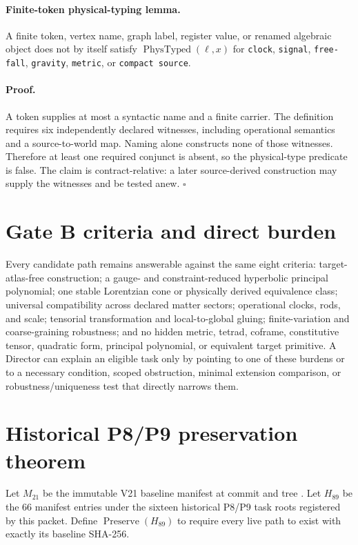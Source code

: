 \documentclass[11pt]{article}
\newcommand{\Typed}{\operatorname{PhysTyped}}
\newcommand{\Preserve}{\operatorname{Preserve}}
\begin{document}
\paragraph{Finite-token physical-typing lemma.}
A finite token, vertex name, graph label, register value, or renamed algebraic
object does not by itself satisfy $\Typed(\ell,x)$ for \texttt{clock},
\texttt{signal}, \texttt{free-fall}, \texttt{gravity}, \texttt{metric}, or
\texttt{compact source}.

\paragraph{Proof.}
A token supplies at most a syntactic name and a finite carrier. The definition
requires six independently declared witnesses, including operational semantics
and a source-to-world map. Naming alone constructs none of those witnesses.
Therefore at least one required conjunct is absent, so the physical-type
predicate is false. The claim is contract-relative: a later source-derived
construction may supply the witnesses and be tested anew. $\square$

\section{Gate B criteria and direct burden}

Every candidate path remains answerable against the same eight criteria:
target-atlas-free construction; a gauge- and constraint-reduced hyperbolic
principal polynomial; one stable Lorentzian cone or physically derived
equivalence class; universal compatibility across declared matter sectors;
operational clocks, rods, and scale; tensorial transformation and
local-to-global gluing; finite-variation and coarse-graining robustness; and no
hidden metric, tetrad, coframe, constitutive tensor, quadratic form, principal
polynomial, or equivalent target primitive. A Director can explain an eligible
task only by pointing to one of these burdens or to a necessary condition,
scoped obstruction, minimal extension comparison, or robustness/uniqueness
test that directly narrows them.

\section{Historical P8/P9 preservation theorem}

Let $M_{21}$ be the immutable V21 baseline manifest at commit
 and tree
. Let $H_{89}$ be the
66 manifest entries under the sixteen historical P8/P9 task roots registered
by this packet. Define $\Preserve(H_{89})$ to require every live path to exist
with exactly its baseline SHA-256.
\end{document}
